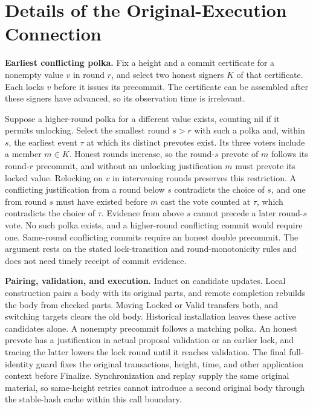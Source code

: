 \section{Details of the Original-Execution Connection}
\label{supp:original-execution}

\noindent\textbf{Earliest conflicting polka.}
Fix a height and a commit certificate for a nonempty value $v$ in round $r$, and select two honest signers $K$ of that certificate. Each locks $v$ before it issues its precommit. The certificate can be assembled after these signers have advanced, so its observation time is irrelevant.

Suppose a higher-round polka for a different value exists, counting nil if it permits unlocking. Select the smallest round $s>r$ with such a polka and, within $s$, the earliest event $\tau$ at which its distinct prevotes exist. Its three voters include a member $m\in K$. Honest rounds increase, so the round-$s$ prevote of $m$ follows its round-$r$ precommit, and without an unlocking justification $m$ must prevote its locked value. Relocking on $v$ in intervening rounds preserves this restriction. A conflicting justification from a round below $s$ contradicts the choice of $s$, and one from round $s$ must have existed before $m$ cast the vote counted at $\tau$, which contradicts the choice of $\tau$. Evidence from above $s$ cannot precede a later round-$s$ vote. No such polka exists, and a higher-round conflicting commit would require one. Same-round conflicting commits require an honest double precommit. The argument rests on the stated lock-transition and round-monotonicity rules and does not need timely receipt of commit evidence.

\noindent\textbf{Pairing, validation, and execution.}
Induct on candidate updates. Local construction pairs a body with its original parts, and remote completion rebuilds the body from checked parts. Moving Locked or Valid transfers both, and switching targets clears the old body. Historical installation leaves these active candidates alone. A nonempty precommit follows a matching polka. An honest prevote has a justification in actual proposal validation or an earlier lock, and tracing the latter lowers the lock round until it reaches validation. The final full-identity guard fixes the original transactions, height, time, and other application context before Finalize. Synchronization and replay supply the same original material, so same-height retries cannot introduce a second original body through the stable-hash cache within this call boundary.

